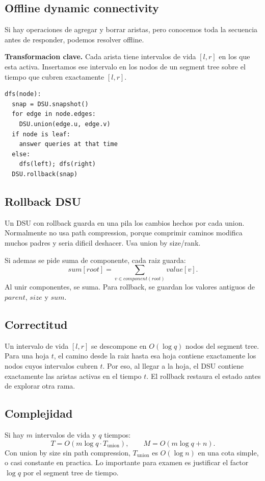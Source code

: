\documentclass[10pt]{article}
\newcommand{\bigO}{O}
\newcommand{\boxhead}[1]{\vspace{3pt}\textbf{#1.}}
\begin{document}
\subsection{Offline dynamic connectivity}
Si hay operaciones de agregar y borrar aristas, pero conocemos toda la secuencia antes de responder, podemos
resolver offline.

\boxhead{Transformacion clave} Cada arista tiene intervalos de vida \([l,r]\) en los que esta activa. Insertamos
ese intervalo en los nodos de un segment tree sobre el tiempo que cubren exactamente \([l,r]\).

\begin{lstlisting}
dfs(node):
  snap = DSU.snapshot()
  for edge in node.edges:
    DSU.union(edge.u, edge.v)
  if node is leaf:
    answer queries at that time
  else:
    dfs(left); dfs(right)
  DSU.rollback(snap)
\end{lstlisting}

\subsection{Rollback DSU}
Un DSU con rollback guarda en una pila los cambios hechos por cada union. Normalmente no usa path compression,
porque comprimir caminos modifica muchos padres y seria dificil deshacer. Usa union by size/rank.

Si ademas se pide suma de componente, cada raiz guarda:
\[
sum[root]=\sum_{v\in component(root)} value[v].
\]
Al unir componentes, se suma. Para rollback, se guardan los valores antiguos de \(parent\), \(size\) y \(sum\).

\subsection{Correctitud}
Un intervalo de vida \([l,r]\) se descompone en \(\bigO(\log q)\) nodos del segment tree. Para una hoja \(t\),
el camino desde la raiz hasta esa hoja contiene exactamente los nodos cuyos intervalos cubren \(t\). Por eso, al
llegar a la hoja, el DSU contiene exactamente las aristas activas en el tiempo \(t\). El rollback restaura el estado
antes de explorar otra rama.

\subsection{Complejidad}
Si hay \(m\) intervalos de vida y \(q\) tiempos:
\[
T=\bigO(m\log q\cdot T_{\text{union}}),\qquad M=\bigO(m\log q+n).
\]
Con union by size sin path compression, \(T_{\text{union}}\) es \(\bigO(\log n)\) en una cota simple, o casi constante
en practica. Lo importante para examen es justificar el factor \(\log q\) por el segment tree de tiempo.
\end{document}
